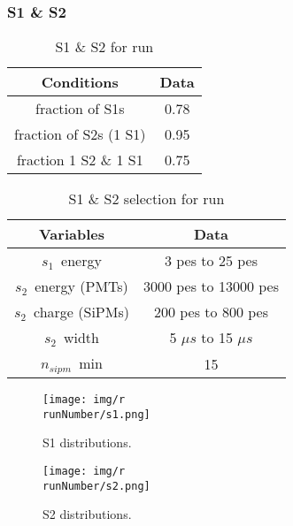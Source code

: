 \begin{frame}
\frametitle{S1 \& S2}

\begin{table}[h!]
\caption{S1 \& S2 for run \runNumber}
\begin{center}
\begin{tabular}{|c|c|}
\hline
Conditions & Data \\
\hline
fraction of S1s & 0.78 \\
fraction of S2s (1 S1) & 0.95 \\
fraction 1 S2 \& 1 S1 & 0.75 \\
\hline
\end{tabular}
\end{center}
\label{r\runNumber.data}
\end{table}%

\begin{table}[h!]
\caption{S1 \& S2 selection for run \runNumber}
\begin{center}
\begin{tabular}{|c|c|}
\hline
Variables & Data \\
\hline
$s_1$~energy & 3 pes to 25 pes \\
$s_2$~energy (PMTs) & 3000 pes to 13000 pes \\
$s_2$~charge (SiPMs) & 200 pes to 800 pes \\
$s_2$~width & 5 $\mu s$ to 15 $\mu s$ \\
$n_{sipm}$~min & 15\\
\hline
\end{tabular}
\end{center}
\label{r\runNumber.sel}
\end{table}%
\end{frame}


\begin{frame}
\begin{figure}
  \begin{center}
      \texttt{[image: img/r\\runNumber/s1.png]}
    \caption{S1 distributions.}
  \end{center}
\end{figure}
\end{frame}

\begin{frame}
\begin{figure}
  \begin{center}
      \texttt{[image: img/r\\runNumber/s2.png]}
    \caption{S2 distributions.}
  \end{center}
\end{figure}
\end{frame}

